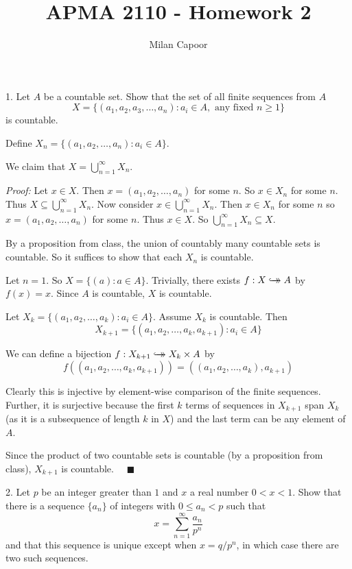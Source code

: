 \documentclass[12pt]{article}
\title{APMA 2110 - Homework 2}
\author{Milan Capoor}
\date{}
\newcommand{\qed}{\quad \blacksquare}
\newcommand{\sub}{\subseteq}
\newcommand{\biject}{\hookrightarrow \hspace{-8pt} \rightarrow}
\begin{document}
\maketitle

1. Let $A$ be a countable set. Show that the set of all finite sequences from $A$ 
\[X = \{(a_1, a_2, a_3, \dots, a_n): a_i \in A, \text{ any fixed } n \geq 1\}\] 
is countable.

    \color{blue}
        Define $X_n = \{(a_1, a_2, \dots, a_n): a_i \in A\}$. 

        We claim that $X = \bigcup_{n=1}^{\infty} X_n$. 
        
        \begin{tcolorbox}[colback=blue!5!white,colframe=blue!75!black,coltext=blue]
            \emph{Proof:} Let $x \in X$. Then $x = (a_1, a_2, \dots, a_n)$ for some $n$. So $x \in X_n$ for some $n$. Thus $X \sub \bigcup_{n=1}^{\infty} X_n$. Now consider $x \in \bigcup_{n=1}^{\infty} X_n$. Then $x \in X_n$ for some $n$ so $x = (a_1, a_2, \dots, a_n)$ for some $n$. Thus $x \in X$. So $\bigcup_{n=1}^{\infty} X_n \sub X$. 
        \end{tcolorbox}

        By a proposition from class, the union of countably many countable sets is countable. So it suffices to show that each $X_n$ is countable.

        Let $n = 1$. So $X = \{(a): a \in A\}$. Trivially, there exists $f: X \biject A$ by $f(x) = x$. Since $A$ is countable, $X$ is countable.

        Let $X_k = \{(a_1, a_2, \dots, a_k): a_i \in A\}$. Assume $X_k$ is countable. Then 
        \[X_{k+1} = \{(a_1, a_2, \dots, a_k, a_{k+1}): a_i \in A\}\] 

        We can define a bijection $f: X_{k+1} \biject X_k \times A$ by
        \[f((a_1, a_2, \dots, a_k, a_{k+1})) = ((a_1, a_2, \dots, a_k), a_{k+1})\]

        Clearly this is injective by element-wise comparison of the finite sequences. Further, it is surjective because the first $k$ terms of sequences in $X_{k+1}$ span $X_k$ (as it is a subsequence of length $k$ in $X$) and the last term can be any element of $A$.
        
        Since the product of two countable sets is countable (by a proposition from class), $X_{k+1}$ is countable. $\qed$

    \color{black}


\pagebreak

2. Let $p$ be an integer greater than $1$ and $x$ a real number $0 < x < 1$. Show that there is a sequence $\{a_n\}$ of integers with $0 \leq a_n < p$ such that 
\[x = \sum_{n=1}^\infty \frac{a_n}{p^n} \]
and that this sequence is unique except when $x = q/p^n$, in which case there are two such sequences.
\end{document}

